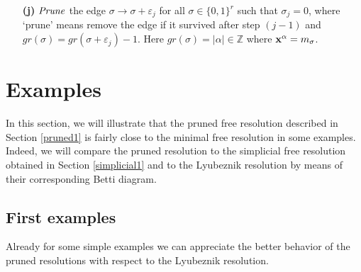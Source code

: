 \documentclass[12pt]{amsart}
\theoremstyle{definition}
\theoremstyle{remark}
\numberwithin{equation}{section}
\newcommand{\bZ}{{\mathbb{Z}}}
\newcommand{\lra}{{\longrightarrow}}
\newcommand{\phil}[1]{{\color{red} \sf $\star\star$ Philippe: [#1]}}
\begin{document}
\vskip 2mm

\begin{itemize}

\item[\textbf{(j)}] ${\it Prune}$ the edge ${\sigma} \lra{\sigma + \varepsilon_j}$ for
all $\sigma \in \{0,1\}^r$ such that $\sigma_j=0$, where `prune'
means remove the edge if it survived after step $(j-1)$ and
$gr(\sigma)=gr(\sigma + \varepsilon_j) -1 $.
Here $gr(\sigma)=|\alpha| \in \bZ$ where ${\bf x}^\alpha=m_\sigma$.

\end{itemize}



\section{Examples} \label{examples}

In this section, we will illustrate that the
pruned free resolution described in Section \ref{pruned1} is fairly
close to the minimal free resolution in some examples.
Indeed, we will compare the pruned resolution to the
simplicial free resolution obtained in Section \ref{simplicial1} and to the
Lyubeznik resolution by means of their corresponding Betti diagram.

\vskip 2mm

\subsection{First examples}

Already for some simple examples we can appreciate the better behavior of the pruned
resolutions with respect to the Lyubeznik resolution.
\end{document}
